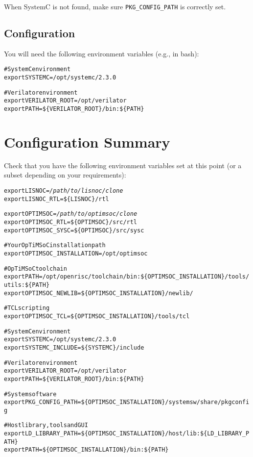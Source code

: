 When SystemC is not found, make sure \verb|PKG_CONFIG_PATH| is
correctly set.

\subsection{Configuration}

You will need the following environment variables (e.g., in bash):

\begin{alltt}
# SystemC environment
export SYSTEMC=/opt/systemc/2.3.0

# Verilator environment
export VERILATOR\_ROOT=/opt/verilator
export PATH=\$\{VERILATOR_ROOT\}/bin:\$\{PATH\}
\end{alltt}

\section{Configuration Summary}

Check that you have the following environment variables set at this
point (or a subset depending on your requirements):

\begin{alltt}
export LISNOC=\emph{/path/to/lisnoc/clone}
export LISNOC_RTL=\$\{LISNOC\}/rtl

export OPTIMSOC=\emph{/path/to/optimsoc/clone}
export OPTIMSOC_RTL=\$\{OPTIMSOC\}/src/rtl
export OPTIMSOC_SYSC=\$\{OPTIMSOC\}/src/sysc

# Your OpTiMSoC installation path
export OPTIMSOC_INSTALLATION=/opt/optimsoc

# OpTiMSoC toolchain
export PATH=/opt/openrisc/toolchain/bin:\$\{OPTIMSOC_INSTALLATION\}/tools/utils:\$\{PATH\}
export OPTIMSOC_NEWLIB=\$\{OPTIMSOC_INSTALLATION\}/newlib/

# TCL scripting
export OPTIMSOC_TCL=\$\{OPTIMSOC_INSTALLATION\}/tools/tcl

# SystemC environment
export SYSTEMC=/opt/systemc/2.3.0
export SYSTEMC_INCLUDE=\$\{SYSTEMC\}/include

# Verilator environment
export VERILATOR\_ROOT=/opt/verilator
export PATH=\$\{VERILATOR_ROOT\}/bin:\$\{PATH\}

# System software
export PKG_CONFIG_PATH=\$\{OPTIMSOC_INSTALLATION\}/systemsw/share/pkgconfig

# Host library, tools and GUI
export LD_LIBRARY_PATH=\$\{OPTIMSOC_INSTALLATION\}/host/lib:\$\{LD_LIBRARY_PATH\}
export PATH=\$\{OPTIMSOC_INSTALLATION\}/bin:\$\{PATH\}
\end{alltt}

